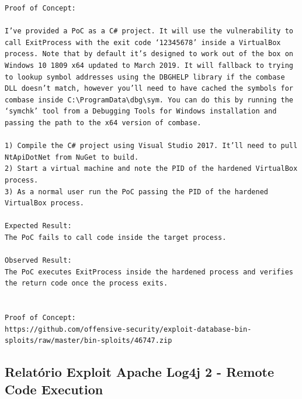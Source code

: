 \documentclass[11t]{article}
\begin{document}
\begin{lstlisting}[breaklines=true]
Proof of Concept:

I’ve provided a PoC as a C# project. It will use the vulnerability to call ExitProcess with the exit code ‘12345678’ inside a VirtualBox process. Note that by default it’s designed to work out of the box on Windows 10 1809 x64 updated to March 2019. It will fallback to trying to lookup symbol addresses using the DBGHELP library if the combase DLL doesn’t match, however you’ll need to have cached the symbols for combase inside C:\ProgramData\dbg\sym. You can do this by running the ‘symchk’ tool from a Debugging Tools for Windows installation and passing the path to the x64 version of combase.

1) Compile the C# project using Visual Studio 2017. It’ll need to pull NtApiDotNet from NuGet to build.
2) Start a virtual machine and note the PID of the hardened VirtualBox process.
3) As a normal user run the PoC passing the PID of the hardened VirtualBox process.

Expected Result:
The PoC fails to call code inside the target process.

Observed Result:
The PoC executes ExitProcess inside the hardened process and verifies the return code once the process exits.


Proof of Concept:
https://github.com/offensive-security/exploit-database-bin-sploits/raw/master/bin-sploits/46747.zip
\end{lstlisting}

\clearpage



\subsection*{Relatório Exploit Apache Log4j 2 - Remote Code Execution}
\end{document}
